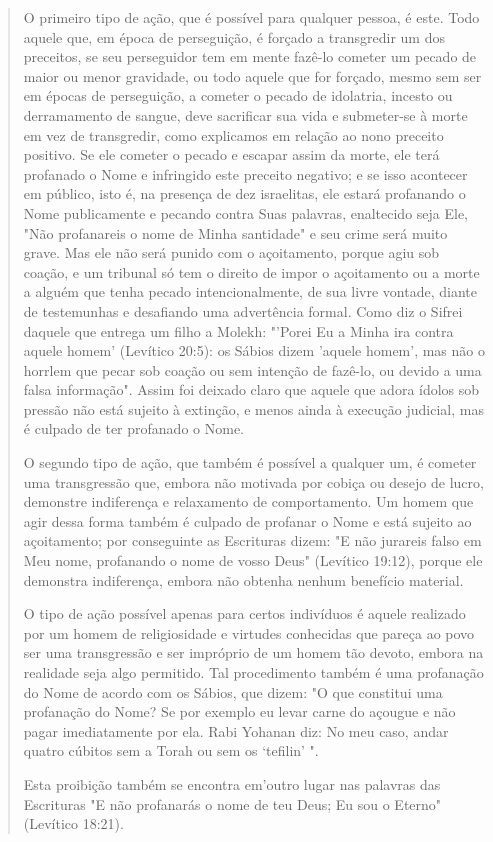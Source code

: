 \begin{quote}
O primeiro tipo de ação, que é possível para qualquer pessoa, é es­te.
Todo aquele que, em época de perseguição, é forçado a transgredir um dos
preceitos, se seu perseguidor tem em mente fazê-lo cometer um pecado de
maior ou menor gravidade, ou todo aquele que for forçado, mesmo sem ser
em épo­cas de perseguição, a cometer o pecado de idolatria, incesto ou
derramamento de sangue, deve sacrificar sua vida e submeter-se à morte
em vez de transgre­dir, como explicamos em relação ao nono preceito
positivo. Se ele cometer o pecado e escapar assim da morte, ele terá
profanado o Nome e infringido este preceito negativo; e se isso
acontecer em público, isto é, na presença de dez israelitas, ele estará
profanando o Nome publicamente e pecando contra Suas palavras,
enaltecido seja Ele, "Não profanareis o nome de Minha santidade" e seu
crime será muito grave. Mas ele não será punido com o açoitamento,
por­que agiu sob coação, e um tribunal só tem o direito de impor o
açoitamento ou a morte a alguém que tenha pecado intencionalmente, de
sua livre vontade, diante de testemunhas e desafiando uma advertência
formal. Como diz o Sifrei daquele que entrega um filho a Molekh: "'Porei
Eu a Minha ira contra aquele homem' (Levítico 20:5): os Sábios dizem
'aquele homem', mas não o horrlem que pecar sob coação ou sem intenção
de fazê-lo, ou devido a uma falsa infor­mação". Assim foi deixado claro
que aquele que adora ídolos sob pressão não está sujeito à extinção, e
menos ainda à execução judicial, mas é culpado de ter profanado o Nome.

O segundo tipo de ação, que também é possível a qualquer um, é cometer
uma transgressão que, embora não motivada por cobiça ou desejo de lucro,
demonstre indiferença e relaxamento de comportamento. Um homem que agir
dessa forma também é culpado de profanar o Nome e está sujeito ao
açoitamento; por conseguinte as Escrituras dizem: "E não jurareis falso
em Meu nome, profanando o nome de vosso Deus" (Levítico 19:12), porque
ele demons­tra indiferença, embora não obtenha nenhum benefício
material.

O tipo de ação possível apenas para certos indivíduos é aquele
reali­zado por um homem de religiosidade e virtudes conhecidas que
pareça ao po­vo ser uma transgressão e ser impróprio de um homem tão
devoto, embora na realidade seja algo permitido. Tal procedimento também
é uma profanação do Nome de acordo com os Sábios, que dizem: "O que
constitui uma profana­ção do Nome? Se por exemplo eu levar carne do
açougue e não pagar imediata­mente por ela. Rabi Yohanan diz: No meu
caso, andar quatro cúbitos sem a Torah ou sem os `tefilin' ".

Esta proibição também se encontra em'outro lugar nas palavras das
Escrituras "E não profanarás o nome de teu Deus; Eu sou o Eterno"
(Levítico 18:21).
\end{quote}

